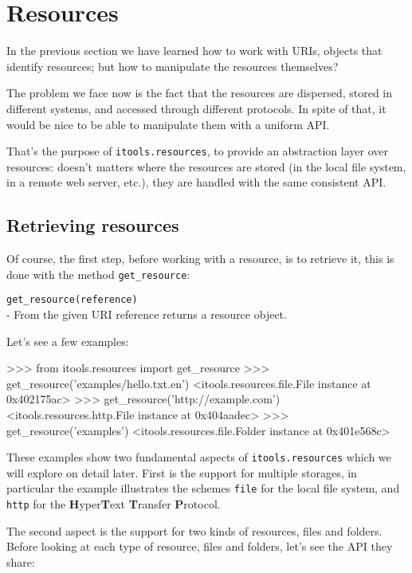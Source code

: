 \chapter{Resources}

In the previous section we have learned how to work with URIs, objects that
identify resources; but how to manipulate the resources themselves?

The problem we face now is the fact that the resources are dispersed, stored
in different systems, and accessed through different protocols. In spite of
that, it would be nice to be able to manipulate them with a uniform API.

That's the purpose of {\tt itools.resources}, to provide an abstraction layer
over resources: doesn't matters where the resources are stored (in the local
file system, in a remote web server, etc.), they are handled with the same
consistent API.

\section{Retrieving resources}

Of course, the first step, before working with a resource, is to retrieve it,
this is done with the method {\tt get\_resource}:

\begin{api}
  {\tt get\_resource(reference)}\\
  - From the given URI reference returns a resource object.
\end{api}

Let's see a few examples:

\begin{code}
    >>> from itools.resources import get_resource
    >>> get_resource('examples/hello.txt.en')
    <itools.resources.file.File instance at 0x402175ac>
    >>> get_resource('http://example.com')
    <itools.resources.http.File instance at 0x404aadec>
    >>> get_resource('examples')
    <itools.resources.file.Folder instance at 0x401e568c>
\end{code}

These examples show two fundamental aspects of {\tt itools.resources} which
we will explore on detail later. First is the support for multiple storages,
in particular the example illustrates the schemes {\tt file} for the local
file system, and {\tt http} for the {\bf H}yper{\bf T}ext {\bf T}ransfer
{\bf P}rotocol.

The second aspect is the support for two kinds of resources, files and folders.
Before looking at each type of resource, files and folders, let's see the API
they share:

